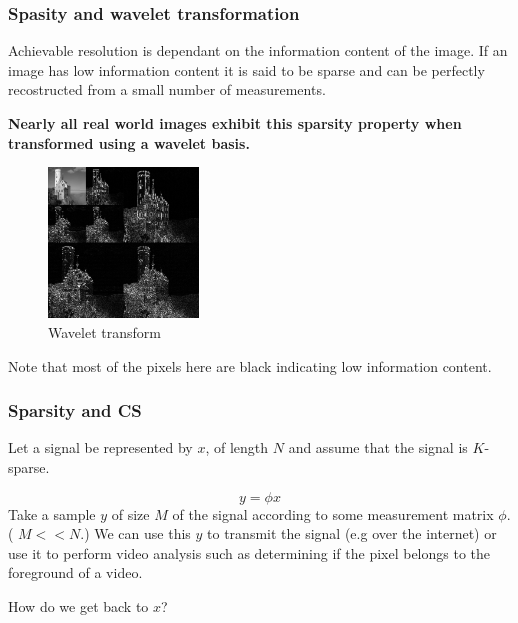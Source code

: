 \documentclass{beamer}
\begin{document}




\begin{frame}
  \frametitle{Spasity and wavelet transformation}
Achievable resolution is dependant on the information content of the image. If an image has low information content  it is said to be sparse and can be perfectly recostructed from a small number of measurements. 

\bf{Nearly all real world images exhibit this sparsity property when transformed using a wavelet basis.}

  \begin{figure}[h]
    \centering
    \includegraphics[height = 4cm]{wavelets}
    \caption{Wavelet transform}
    \label{fig:wavelet}
  \end{figure}

Note that most of the pixels here are black indicating low information content.
 \end{frame}

\begin{frame}
  \frametitle{Sparsity and CS}
  Let a signal be represented by $x$, of length $N$ and assume that the signal is $K$- sparse.

  \begin{equation}
    \label{eq:2}
    y = \phi x
  \end{equation}
Take a sample $y$ of size $M$ of the signal according to some measurement matrix $\phi$. ( $M < < N$.) 
We can use this $y$ to transmit the signal (e.g over the internet) or use it to perform video analysis such as determining if the pixel belongs to the foreground of a video.

How do we get back to $x$?
\end{frame}
\end{document}
